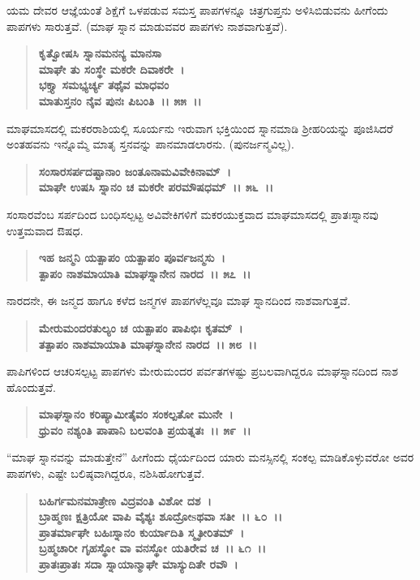 ಯಮ ದೇವರ ಆಜ್ಞೆಯಂತೆ ಶಿಕ್ಷೆಗೆ ಒಳಪಡುವ ಸಮಸ್ತ ಪಾಪಗಳನ್ನೂ ಚಿತ್ರಗುಪ್ತನು ಅಳಿಸಿಬಿಡುವನು ಹೀಗೆಂದು ಪಾಪಗಳು ಸಾರುತ್ತವೆ. (ಮಾಘ ಸ್ನಾನ ಮಾಡುವವರ ಪಾಪಗಳು ನಾಶವಾಗುತ್ತವೆ).

\begin{verse}
\textbf{ಕೃತ್ವೋಷಸಿ ಸ್ನಾನಮನನ್ಯ ಮಾನಸಾ}\\\textbf{ಮಾಘೇ ತು ಸಂಸ್ಥೇ ಮಕರೇ ದಿವಾಕರೇ~।}\\\textbf{ಭಕ್ತ್ಯಾ ಸಮಭ್ಯರ್ಚ್ಯ ತಥೈವ ಮಾಧವಂ} \\\textbf{ಮಾತುಸ್ತನಂ ನೈವ ಪುನಃ ಪಿಬಂತಿ~।। ೫೫~।।}
\end{verse}

ಮಾಘಮಾಸದಲ್ಲಿ ಮಕರರಾಶಿಯಲ್ಲಿ ಸೂರ್ಯನು ಇರುವಾಗ ಭಕ್ತಿಯಿಂದ ಸ್ನಾನಮಾಡಿ ಶ‍್ರೀಹರಿಯನ್ನು ಪೂಜಿಸಿದರೆ ಅಂತಹವನು ಇನ್ನೊಮ್ಮೆ ಮಾತೃ ಸ್ತನವನ್ನು ಪಾನಮಾಡಲಾರನು. (ಪುನರ್ಜನ್ಮವಿಲ್ಲ).

\begin{verse}
\textbf{ಸಂಸಾರಸರ್ಪದಷ್ಟಾನಾಂ ಜಂತೂನಾಮವಿವೇಕಿನಾಮ್~।}\\\textbf{ಮಾಘೇ ಉಷಸಿ ಸ್ನಾನಂ ಚ ಮಕರೇ ಪರಮೌಷಧಮ್~।। ೫೬~।।}
\end{verse}

ಸಂಸಾರವೆಂಬ ಸರ್ಪದಿಂದ ಬಂಧಿಸಲ್ಪಟ್ಟ ಅವಿವೇಕಿಗಳಿಗೆ ಮಕರಯುಕ್ತವಾದ ಮಾಘಮಾಸದಲ್ಲಿ ಪ್ರಾತಃಸ್ನಾನವು ಉತ್ತಮವಾದ ಔಷಧ.

\begin{verse}
\textbf{ಇಹ ಜನ್ಮನಿ ಯತ್ಪಾಪಂ ಯತ್ಪಾಪಂ ಪೂರ್ವಜನ್ಮಸು~।}\\\textbf{ತ್ಪಾಪಂ ನಾಶಮಾಯಾತಿ ಮಾಘಸ್ನಾನೇನ ನಾರದ~।। ೫೭~।।}
\end{verse}

ನಾರದನೇ, ಈ ಜನ್ಮದ ಹಾಗೂ ಕಳೆದ ಜನ್ಮಗಳ ಪಾಪಗಳೆಲ್ಲವೂ ಮಾಘ ಸ್ನಾನದಿಂದ ನಾಶವಾಗುತ್ತವೆ.

\begin{verse}
\textbf{ಮೇರುಮಂದರತುಲ್ಯಂ ಚ ಯತ್ಪಾಪಂ ಪಾಪಿಭಿಃ ಕೃತಮ್~।}\\\textbf{ತತ್ಪಾಪಂ ನಾಶಮಾಯಾತಿ ಮಾಘಸ್ನಾನೇನ ನಾರದ~।। ೫೮~।।}
\end{verse}

ಪಾಪಿಗಳಿಂದ ಆಚರಿಸಲ್ಪಟ್ಟ ಪಾಪಗಳು ಮೇರುಮಂದರ ಪರ್ವತಗಳಷ್ಟು ಪ್ರಬಲವಾಗಿದ್ದರೂ ಮಾಘಸ್ನಾನದಿಂದ ನಾಶ ಹೊಂದುತ್ತವೆ.

\begin{verse}
\textbf{ಮಾಘಸ್ನಾನಂ ಕರಿಷ್ಯಾಮೀತೈವಂ ಸಂಕಲ್ಪತೋ ಮುನೇ~।}\\\textbf{ಧ್ರುವಂ ನಶ್ಯಂತಿ ಪಾಪಾನಿ ಬಲವಂತಿ ಪ್ರಯತ್ನತಃ~।। ೫೯~।।}
\end{verse}

“ಮಾಘ ಸ್ನಾನವನ್ನು ಮಾಡುತ್ತೇನೆ” ಹೀಗೆಂದು ಧೈರ್ಯದಿಂದ ಯಾರು ಮನಸ್ಸಿನಲ್ಲಿ ಸಂಕಲ್ಪ ಮಾಡಿಕೊಳ್ಳುವರೋ ಅವರ ಪಾಪಗಳು, ಎಷ್ಟೇ ಬಲಿಷ್ಠವಾಗಿದ್ದರೂ, ನಶಿಸಿಹೋಗುತ್ತವೆ.

\begin{verse}
\textbf{ಬಹಿರ್ಗಮನಮಾತ್ರೇಣ ವಿದ್ರವಂತಿ ವಿಶೋ ದಶ~।}\\\textbf{ಬ್ರಾಹ್ಮಣಃ ಕ್ಷತ್ರಿಯೋ ವಾಪಿ ವೈಶ್ಯಃ ಶೂದ್ರೋsಥವಾ ಸತೀ~।। ೬೦~।। }\\\textbf{ಪ್ರಾತರ್ಮಾಘೇ ಬಹಿಃಸ್ನಾನಂ ಕುರ್ಯಾದಿತಿ ಸ್ಮೃತೀರಿತಮ್~।}\\\textbf{ಬ್ರಹ್ಮಚಾರೀ ಗೃಹಸ್ಥೋ ವಾ ವನಸ್ಥೋ ಯತಿರೇವ ಚ~।। ೬೧~।।} \\\textbf{ಪ್ರಾತಃಪ್ರಾತಃ ಸದಾ ಸ್ನಾಯಾನ್ಮಾಘೇ ಮಾಸ್ಯುದಿತೇ ರವೌ~।}
\end{verse}

